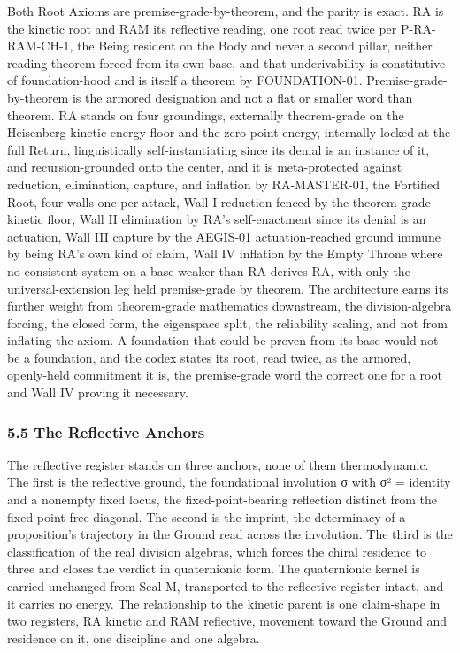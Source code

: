 \documentclass[10pt,twocolumn]{article}
\begin{document}
Both Root Axioms are premise-grade-by-theorem, and the parity is exact.
RA is the kinetic root and RAM its reflective reading, one root read
twice per P-RA-RAM-CH-1, the Being resident on the Body and never a
second pillar, neither reading theorem-forced from its own base, and
that underivability is constitutive of foundation-hood and is itself a
theorem by FOUNDATION-01. Premise-grade-by-theorem is the armored
designation and not a flat or smaller word than theorem. RA stands on
four groundings, externally theorem-grade on the Heisenberg
kinetic-energy floor and the zero-point energy, internally locked at the
full Return, linguistically self-instantiating since its denial is an
instance of it, and recursion-grounded onto the center, and it is
meta-protected against reduction, elimination, capture, and inflation by
RA-MASTER-01, the Fortified Root, four walls one per attack, Wall I
reduction fenced by the theorem-grade kinetic floor, Wall II elimination
by RA's self-enactment since its denial is an actuation, Wall III
capture by the AEGIS-01 actuation-reached ground immune by being RA's
own kind of claim, Wall IV inflation by the Empty Throne where no
consistent system on a base weaker than RA derives RA, with only the
universal-extension leg held premise-grade by theorem. The architecture
earns its further weight from theorem-grade mathematics downstream, the
division-algebra forcing, the closed form, the eigenspace split, the
reliability scaling, and not from inflating the axiom. A foundation that
could be proven from its base would not be a foundation, and the codex
states its root, read twice, as the armored, openly-held commitment it
is, the premise-grade word the correct one for a root and Wall IV
proving it necessary.

\hypertarget{the-reflective-anchors}{%
\subsubsection{5.5 The Reflective
Anchors}\label{the-reflective-anchors}}

The reflective register stands on three anchors, none of them
thermodynamic. The first is the reflective ground, the foundational
involution σ with σ² = identity and a nonempty fixed locus, the
fixed-point-bearing reflection distinct from the fixed-point-free
diagonal. The second is the imprint, the determinacy of a proposition's
trajectory in the Ground read across the involution. The third is the
classification of the real division algebras, which forces the chiral
residence to three and closes the verdict in quaternionic form. The
quaternionic kernel is carried unchanged from Seal M, transported to the
reflective register intact, and it carries no energy. The relationship
to the kinetic parent is one claim-shape in two registers, RA kinetic
and RAM reflective, movement toward the Ground and residence on it, one
discipline and one algebra.
\end{document}
